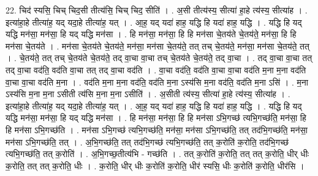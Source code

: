 \documentclass[17pt]{extarticle}
\begin{document}
22. चिद॑ स्यसि॒ चिच् चिद॒सी तीत्य॑सि॒ चिच् चिद॒ सीति॑ । . अ॒सी तीत्य॑स्य॒ सीत्या॑ हा॒हे त्य॑स्य॒ सीत्या॑ह । . इत्या॑हा॒हे तीत्या॑ह॒ यद् यदा॒हे तीत्या॑ह॒ यत् । . आ॒ह॒ यद् यदा॑ हाह॒ यद्धि हि यदा॑ हाह॒ यद्धि । . यद्धि हि यद् यद्धि मन॑सा॒ मन॑सा॒ हि यद् यद्धि मन॑सा । . हि मन॑सा॒ मन॑सा॒ हि हि मन॑सा चे॒तय॑ते चे॒तय॑ते॒ मन॑सा॒ हि हि मन॑सा चे॒तय॑ते । . मन॑सा चे॒तय॑ते चे॒तय॑ते॒ मन॑सा॒ मन॑सा चे॒तय॑ते॒ तत् तच् चे॒तय॑ते॒ मन॑सा॒ मन॑सा चे॒तय॑ते॒ तत् । . चे॒तय॑ते॒ तत् तच् चे॒तय॑ते चे॒तय॑ते॒ तद् वा॒चा वा॒चा तच् चे॒तय॑ते चे॒तय॑ते॒ तद् वा॒चा । . तद् वा॒चा वा॒चा तत् तद् वा॒चा वद॑ति॒ वद॑ति वा॒चा तत् तद् वा॒चा वद॑ति । . वा॒चा वद॑ति॒ वद॑ति वा॒चा वा॒चा वद॑ति म॒ना म॒ना वद॑ति वा॒चा वा॒चा वद॑ति म॒ना । . वद॑ति म॒ना म॒ना वद॑ति॒ वद॑ति म॒ना ऽस्य॑सि म॒ना वद॑ति॒ वद॑ति म॒ना ऽसि॑ । . म॒ना ऽस्य॑सि म॒ना म॒ना ऽसीती त्य॑सि म॒ना म॒ना ऽसीति॑ । . अ॒सीती त्य॑स्य॒ सीत्या॑ हा॒हे त्य॑स्य॒ सीत्या॑ह । . इत्या॑हा॒हे तीत्या॑ह॒ यद् यदा॒हे तीत्या॑ह॒ यत् । . आ॒ह॒ यद् यदा॑ हाह॒ यद्धि हि यदा॑ हाह॒ यद्धि । . यद्धि हि यद् यद्धि मन॑सा॒ मन॑सा॒ हि यद् यद्धि मन॑सा । . हि मन॑सा॒ मन॑सा॒ हि हि मन॑सा ऽभि॒गच्छ॑ त्यभि॒गच्छ॑ति॒ मन॑सा॒ हि हि मन॑सा ऽभि॒गच्छ॑ति । . मन॑सा ऽभि॒गच्छ॑ त्यभि॒गच्छ॑ति॒ मन॑सा॒ मन॑सा ऽभि॒गच्छ॑ति॒ तत् तद॑भि॒गच्छ॑ति॒ मन॑सा॒ मन॑सा ऽभि॒गच्छ॑ति॒ तत् । . अ॒भि॒गच्छ॑ति॒ तत् तद॑भि॒गच्छ॑ त्यभि॒गच्छ॑ति॒ तत् क॒रोति॑ क॒रोति॒ तद॑भि॒गच्छ॑ त्यभि॒गच्छ॑ति॒ तत् क॒रोति॑ । . अ॒भि॒गच्छ॒तीत्य॑भि - गच्छ॑ति । . तत् क॒रोति॑ क॒रोति॒ तत् तत् क॒रोति॒ धीर् धीः क॒रोति॒ तत् तत् क॒रोति॒ धीः । . क॒रोति॒ धीर् धीः क॒रोति॑ क॒रोति॒ धीर॑ स्यसि॒ धीः क॒रोति॑ क॒रोति॒ धीर॑सि । \newline
\end{document}
